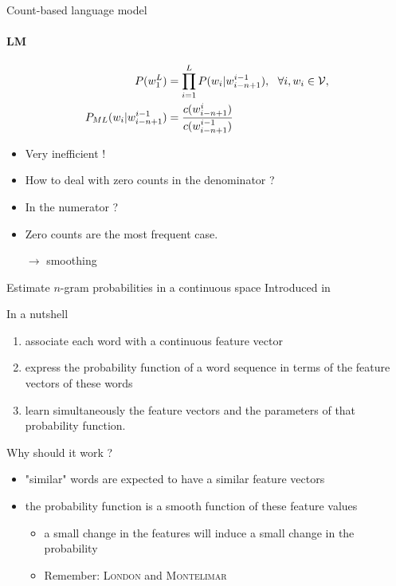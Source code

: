 \begin{frame}{Count-based language model}
  \framesubtitle{\ngram LM}
  \begin{align*}
    P(\wsseq{1}{L}) &= \prod_{i=1}^L P(\ws_i | \wsseq{i-n+1}{i-1}),\ \
                      \forall i , \ws_i \in \vocab,\\
    P_{ML}(\ws_i | \wsseq{i-n+1}{i-1}) &=
                                         \frac{c(\wsseq{i-n+1}{i})}{c(\wsseq{i-n+1}{i-1})}
  \end{align*}
  \begin{itemize}
  \item Very inefficient ! 
  \item How to deal with zero counts in the denominator ? 
  \item In the numerator ? 
  \item Zero counts are the most frequent case. 
  \item[$\rightarrow$] smoothing~\cite{Kneser95Improved,Chen98Empirical}
  \end{itemize}
\end{frame}


\begin{frame}{Estimate $n$-gram probabilities in a continuous space}
  Introduced in~\cite{Bengio01,Bengio03aneural} 
  \begin{block}{In a nutshell}
    \begin{enumerate}
    \item associate each word with a continuous feature vector
    \item express the probability function of a word sequence in terms
      of the feature vectors of these words
    \item learn simultaneously the feature vectors and the parameters
      of that probability function.
    \end{enumerate}
  \end{block}
  \begin{block}{Why should it work ?}
    \begin{itemize}
    \item  "similar" words are expected to have a similar feature vectors
    \item  the probability function is a smooth function of these
      feature values
      \begin{itemize}
      \item  a small change in the features will induce a small
        change in the probability
      \item Remember: \textsc{London} and \textsc{Montelimar}
      \end{itemize}
    \end{itemize}
  \end{block}
\end{frame}


